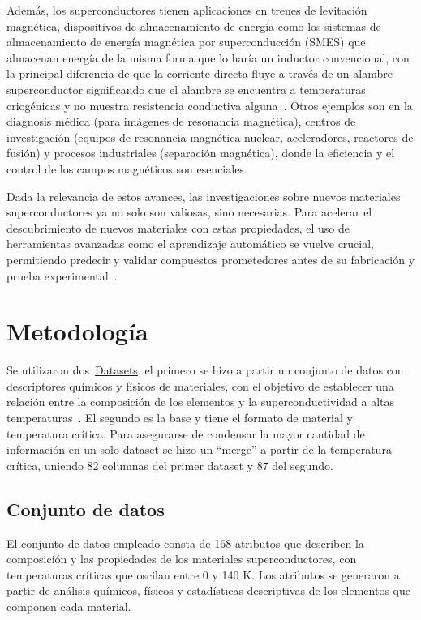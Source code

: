 \documentclass[conference]{IEEEtran} %
\begin{document}
Además, los superconductores tienen aplicaciones en trenes de levitación magnética, 
dispositivos de almacenamiento de energía como los sistemas de almacenamiento de energía magnética por
superconducción (SMES) que almacenan energía de la misma forma que
lo haría un inductor convencional, con la principal diferencia de que
la corriente directa fluye a través de un alambre superconductor significando
que el alambre se encuentra a temperaturas criogénicas
y no muestra resistencia conductiva alguna~\cite{gonzalez2013almacenamiento}. Otros ejemplos son en la 
diagnosis médica (para imágenes de resonancia magnética), centros de
investigación (equipos de resonancia magnética nuclear, aceleradores, reactores de fusión) y
procesos industriales (separación magnética), donde la eficiencia y el control de los 
campos magnéticos son esenciales.


Dada la relevancia de estos avances, las investigaciones sobre nuevos materiales 
superconductores ya no solo son valiosas, sino necesarias. Para acelerar el 
descubrimiento de nuevos materiales con estas propiedades, el uso de herramientas 
avanzadas como el aprendizaje automático se vuelve crucial, permitiendo predecir 
y validar compuestos prometedores antes de su fabricación y prueba experimental~\cite{coll2017superconductividad}.

\section{Metodología}
Se utilizaron dos~\href{https://www.kaggle.com/datasets/tunguz/superconductivty-data-data-set/code}{Datasets}, 
el primero se hizo a partir un conjunto de datos con descriptores químicos y 
físicos de materiales, con el objetivo de establecer una relación entre la 
composición de los elementos y la superconductividad a altas 
temperaturas~\cite{tunguz_superconductivity_dataset}. El segundo es la base y tiene el formato de material y temperatura cr\'itica.
Para asegurarse de condensar la mayor cantidad de información en un solo dataset se hizo 
un ``merge'' a partir de la temperatura cr\'itica, uniendo 82 columnas
del primer dataset y 87 del segundo.
 
\subsection{Conjunto de datos}
El conjunto de datos empleado consta de 168 atributos que describen la 
composición y las propiedades de los materiales superconductores, con 
temperaturas críticas que oscilan entre 0 y 140 K. Los atributos se 
generaron a partir de análisis químicos, físicos y estadísticas 
descriptivas de los elementos que componen cada material.
\end{document}
